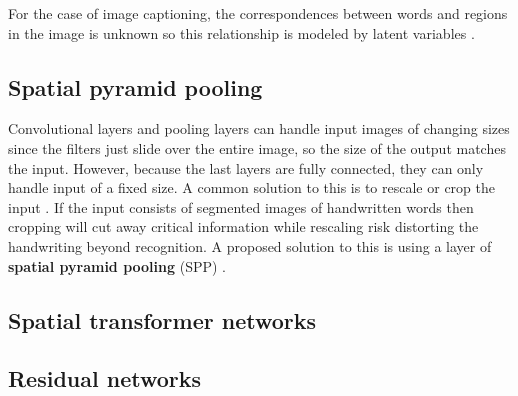 For the case of image captioning, the correspondences between words and regions in the image is unknown so this relationship is modeled by latent variables \cite{VisualSemanticAlignment}.

\subsection{Spatial pyramid pooling}

Convolutional layers and pooling layers can handle input images of changing sizes since the filters just slide over the entire image, so the size of the output matches the input.
However, because the last layers are fully connected, they can only handle input of a fixed size. A common solution to this is to rescale or crop the input \cite{FornesCnnCategorization}. If the input consists of segmented images of handwritten words then cropping will cut away critical information while rescaling risk distorting the handwriting beyond recognition. A proposed solution to this is using a layer of \textbf{spatial pyramid pooling} (SPP) \cite{FornesCnnCategorization}.

\subsection{Spatial transformer networks}


\subsection{Residual networks}

